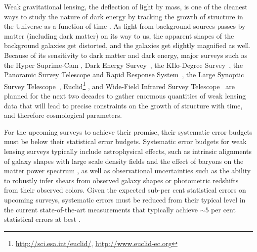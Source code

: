 \documentclass[twocolumn,useAMS,usenatbib]{mn2e}
\newcommand{\rachel}[1]{{\textcolor{red}{#1}}}
\begin{document}
Weak gravitational lensing, the deflection of light by mass, is one of the cleanest ways to study the nature of dark energy by tracking the growth of structure in the Universe as a function of time \citep[e.g.,][]{2001PhR...340..291B,2006astro.ph..9591A,2013PhR...530...87W}.
As light from background sources passes by matter (including dark matter) on its way to us, the apparent shapes of the background galaxies get distorted, and the galaxies get slightly magnified as well.
Because of its sensitivity to dark matter and dark energy, major surveys such as the Hyper Suprime-Cam \citep[HSC;][]{HSC_Overview}, Dark Energy Survey~\citep[DES;][]{DESC}, the KIlo-Degree Survey~\citep[KIDS;][]{KIDS}, the Panoramic Survey Telescope and Rapid Response System~\citep[PanSTARRS;][]{PanSTARRS_2010},
the Large Synoptic Survey Telescope~\citep[LSST;][]{LSST_Book}, Euclid\footnote{\url{http://sci.esa.int/euclid/}, \url{http://www.euclid-ec.org}} \citep{EuclidReport},
and Wide-Field Infrared Survey Telescope~\citep[WFIRST;][]{WFIRST_Final}
are planned for the next two decades to gather enormous quantities of weak lensing data that will lead to precise constraints on the growth of structure with time, and therefore cosmological parameters.

For the upcoming surveys to achieve their promise, their systematic error budgets must be below their statistical error budgets.
Systematic error budgets for weak lensing surveys typically include
astrophysical effects, such as intrinsic alignments of galaxy shapes
with large scale density fields \citep[e.g.,][]{2014arXiv1407.6990T} and the effect of baryons on the
matter power spectrum \citep[e.g.,][]{2011MNRAS.415.3649V}, as well as observational uncertainties such as
the ability to robustly infer shears from observed galaxy shapes or
photometric redshifts from their observed colors.
Given the expected sub-per cent statistical errors on upcoming surveys, systematic errors must be reduced from
 their typical level in the current state-of-the-art
 measurements that typically achieve $\sim 5$ per cent statistical
 errors at best
 \citep[e.g.,][]{2010A&A...516A..63S,2013MNRAS.432.2433H,2013ApJ...765...74J,2013MNRAS.432.1544M}.
\end{document}
